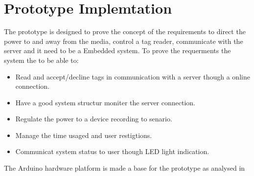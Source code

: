 \section{Prototype Implemtation}
The prototype is designed to prove the concept of the requirements to direct the power to and away from the media, control a tag reader, communicate with the server and it need to be a Embedded system. \newline
To prove the requerments the system the to be able to: 

\begin{itemize}
	\item Read and accept/decline tags in communication with a server though a online connection.
	\item Have a good system structur moniter the server connection.
	\item Regulate the power to a device recording to senario.
	\item Manage the time usaged and user restigtions. 
	\item Communicat system status to user though LED light indication. 
\end{itemize}

The Arduino hardware platform is made a base for the prototype as analysed in  


    